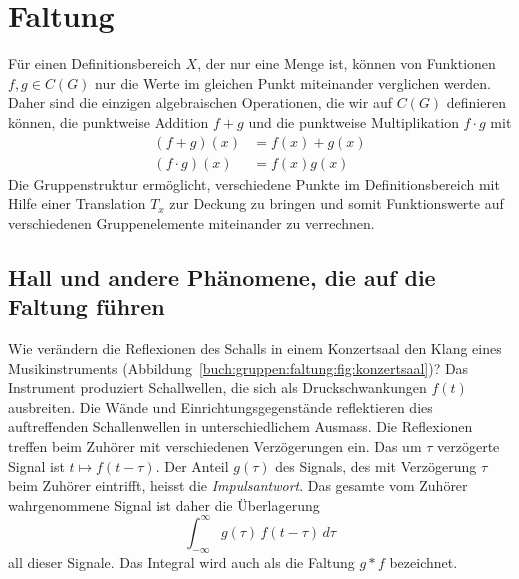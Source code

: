 %
%
%
\section{Faltung
\label{buch:gruppen:section:faltung}}
Für einen Definitionsbereich $X$, der nur eine Menge ist, können
von Funktionen $f,g\in C(G)$ nur die Werte im gleichen Punkt
miteinander verglichen werden. 
Daher sind die einzigen algebraischen Operationen, die wir auf
$C(G)$ definieren können, die punktweise Addition $f+g$ und 
die punktweise Multiplikation $f\cdot g$ mit
\begin{align*}
(f+g)(x)      &= f(x)+g(x) \\
(f\cdot g)(x) &= f(x) g(x)
\end{align*}
Die Gruppenstruktur ermöglicht, verschiedene Punkte im Definitionsbereich
mit Hilfe einer Translation $T_x$ zur Deckung zu bringen und somit
Funktionswerte auf verschiedenen Gruppenelemente miteinander zu verrechnen.

%
% 
\subsection{Hall und andere Phänomene, die auf die Faltung führen
\label{buch:gruppen:faltung:subsection:hall}}

Wie verändern die Reflexionen des Schalls in einem Konzertsaal
den Klang eines Musikinstruments
(Abbildung~\ref{buch:gruppen:faltung:fig:konzertsaal})?
Das Instrument produziert Schallwellen, die sich als Druckschwankungen
$f(t)$ ausbreiten.
Die Wände und Einrichtungsgegenstände reflektieren dies auftreffenden
Schallenwellen in unterschiedlichem Ausmass.
Die Reflexionen treffen beim Zuhörer mit verschiedenen Verzögerungen ein.
Das um $\tau$ verzögerte Signal ist $t\mapsto f(t-\tau)$.
Der Anteil $g(\tau)$ des Signals, des mit Verzögerung $\tau$ beim
Zuhörer eintrifft, heisst die {\em Impulsantwort}.
Das gesamte vom Zuhörer wahrgenommene Signal ist daher die Überlagerung
\begin{equation}
\int_{-\infty}^\infty
g(\tau) 
\,
f(t-\tau)
\,d\tau
\label{buch:gruppen:faltung:eqn:hall}
\end{equation}
all dieser Signale.
Das Integral wird auch als die Faltung $g*f$ bezeichnet.

